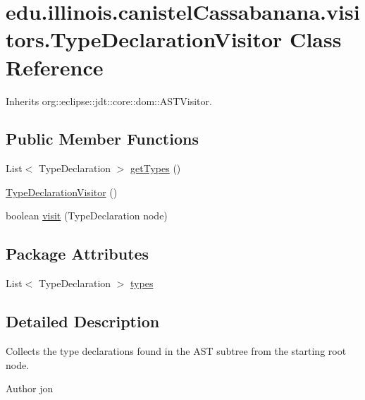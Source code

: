 \hypertarget{classedu_1_1illinois_1_1canistelCassabanana_1_1visitors_1_1TypeDeclarationVisitor}{
\section{edu.illinois.canistelCassabanana.visitors.TypeDeclarationVisitor Class Reference}
\label{classedu_1_1illinois_1_1canistelCassabanana_1_1visitors_1_1TypeDeclarationVisitor}
}


Inherits org::eclipse::jdt::core::dom::ASTVisitor.

\subsection*{Public Member Functions}
\begin{DoxyCompactItemize}
\item 
List$<$ TypeDeclaration $>$ \hyperlink{classedu_1_1illinois_1_1canistelCassabanana_1_1visitors_1_1TypeDeclarationVisitor_acb4ef486a921598670e68b8124f16003}{getTypes} ()
\item 
\hyperlink{classedu_1_1illinois_1_1canistelCassabanana_1_1visitors_1_1TypeDeclarationVisitor_aa6847ca4930b16e3db71384cbf7d4b3c}{TypeDeclarationVisitor} ()
\item 
boolean \hyperlink{classedu_1_1illinois_1_1canistelCassabanana_1_1visitors_1_1TypeDeclarationVisitor_a52eeb7ab079a84a4af4bf540125f39ba}{visit} (TypeDeclaration node)
\end{DoxyCompactItemize}
\subsection*{Package Attributes}
\begin{DoxyCompactItemize}
\item 
List$<$ TypeDeclaration $>$ \hyperlink{classedu_1_1illinois_1_1canistelCassabanana_1_1visitors_1_1TypeDeclarationVisitor_a33379467b18a41b523f1ed8971a9d530}{types}
\end{DoxyCompactItemize}


\subsection{Detailed Description}
Collects the type declarations found in the AST subtree from the starting root node.

\begin{DoxyAuthor}{Author}
jon 
\end{DoxyAuthor}


